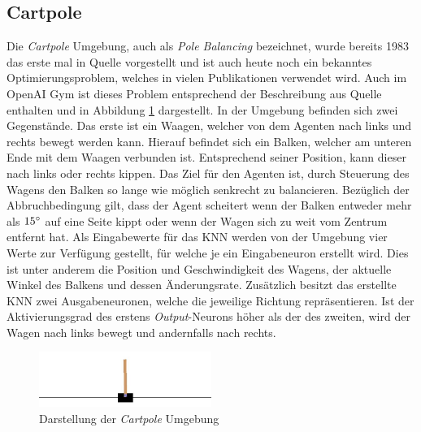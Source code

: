 \subsection{Cartpole}
Die \emph{Cartpole} Umgebung, auch als \emph{Pole Balancing} bezeichnet, wurde bereits 1983 das erste mal in Quelle \cite{barto1983neuronlike} vorgestellt und ist auch heute noch ein bekanntes Optimierungsproblem, welches in vielen Publikationen verwendet wird. Auch im OpenAI Gym ist dieses Problem entsprechend der Beschreibung aus Quelle \cite{barto1983neuronlike} enthalten und in Abbildung \ref{fig:cartpole_environment} dargestellt. In der Umgebung befinden sich zwei Gegenstände. Das erste ist ein Waagen, welcher von dem Agenten nach links und rechts bewegt werden kann. Hierauf befindet sich ein Balken, welcher am unteren Ende mit dem Waagen verbunden ist. Entsprechend seiner Position, kann dieser nach links oder rechts kippen. Das Ziel für den Agenten ist, durch Steuerung des Wagens den Balken so lange wie möglich senkrecht zu balancieren. Bezüglich der Abbruchbedingung gilt, dass der Agent scheitert wenn der Balken entweder mehr als $15\degree$ auf eine Seite kippt oder wenn der Wagen sich zu weit vom Zentrum entfernt hat. Als Eingabewerte für das \ac{KNN} werden von der Umgebung vier Werte zur Verfügung gestellt, für welche je ein Eingabeneuron erstellt wird. Dies ist unter anderem die Position und Geschwindigkeit des Wagens, der aktuelle Winkel des Balkens und dessen Änderungsrate. Zusätzlich besitzt das erstellte \ac{KNN} zwei Ausgabeneuronen, welche die jeweilige Richtung repräsentieren. Ist der Aktivierungsgrad des erstens \emph{Output}-Neurons höher als der des zweiten, wird der Wagen nach links bewegt und andernfalls nach rechts.
\begin{figure}[!h]
	\centering
	\includegraphics[width=0.5\textwidth]{./img/cartpole_env.JPG} 
	\caption{Darstellung der \emph{Cartpole} Umgebung}
	\label{fig:cartpole_environment}
\end{figure} 
